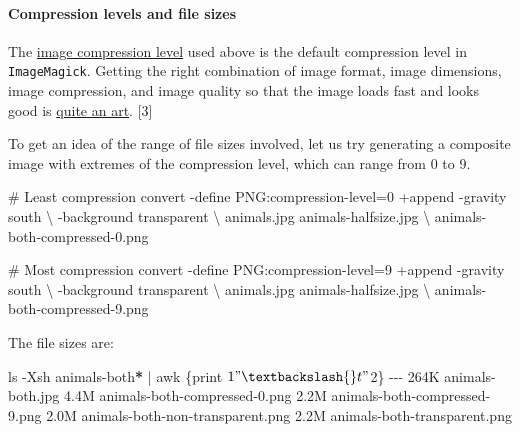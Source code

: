 \documentclass[
  11pt,
  british,
  a4paper,
]{article}
\newenvironment{Shaded}{\begin{snugshade}}{\end{snugshade}}
\newcommand{\AttributeTok}[1]{\textcolor[rgb]{0.80,0.80,0.80}{#1}}
\newcommand{\CommentTok}[1]{\textcolor[rgb]{0.50,0.62,0.50}{#1}}
\newcommand{\DataTypeTok}[1]{\textcolor[rgb]{0.87,0.87,0.75}{#1}}
\newcommand{\ExtensionTok}[1]{\textcolor[rgb]{0.80,0.80,0.80}{#1}}
\newcommand{\FunctionTok}[1]{\textcolor[rgb]{0.94,0.94,0.56}{#1}}
\newcommand{\KeywordTok}[1]{\textcolor[rgb]{0.94,0.87,0.69}{#1}}
\newcommand{\NormalTok}[1]{\textcolor[rgb]{0.80,0.80,0.80}{#1}}
\newcommand{\PreprocessorTok}[1]{\textcolor[rgb]{1.00,0.81,0.69}{\textbf{#1}}}
\newcommand{\StringTok}[1]{\textcolor[rgb]{0.80,0.58,0.58}{#1}}
\begin{document}
\hypertarget{compression-levels-and-file-sizes}{%
\paragraph{Compression levels and file
sizes}\label{compression-levels-and-file-sizes}}

The \href{https://en.wikipedia.org/wiki/Image_compression}{image
compression level} used above is the default compression level in
\texttt{ImageMagick}. Getting the right combination of image format,
image dimensions, image compression, and image quality so that the image
loads fast and looks good is
\href{https://www.smashingmagazine.com/2015/06/efficient-image-resizing-with-imagemagick/}{quite
an art}. {[}3{]}

To get an idea of the range of file sizes involved, let us try
generating a composite image with extremes of the compression level,
which can range from 0 to 9.

\begin{Shaded}
\begin{Highlighting}[]
\CommentTok{\# Least compression}
\ExtensionTok{convert} \AttributeTok{{-}define}\NormalTok{ PNG:compression{-}level=0 +append }\AttributeTok{{-}gravity}\NormalTok{ south }\DataTypeTok{\textbackslash{}}
\NormalTok{{-}background transparent }\DataTypeTok{\textbackslash{}}
\NormalTok{animals.jpg animals{-}halfsize.jpg }\DataTypeTok{\textbackslash{}}
\NormalTok{animals{-}both{-}compressed{-}0.png}

\CommentTok{\# Most compression}
\ExtensionTok{convert} \AttributeTok{{-}define}\NormalTok{ PNG:compression{-}level=9 +append }\AttributeTok{{-}gravity}\NormalTok{ south }\DataTypeTok{\textbackslash{}}
\NormalTok{{-}background transparent }\DataTypeTok{\textbackslash{}}
\NormalTok{animals.jpg animals{-}halfsize.jpg }\DataTypeTok{\textbackslash{}}
\NormalTok{animals{-}both{-}compressed{-}9.png}
\end{Highlighting}
\end{Shaded}

The file sizes are:

\begin{Shaded}
\begin{Highlighting}[]
\FunctionTok{ls} \AttributeTok{{-}Xsh}\NormalTok{ animals{-}both}\PreprocessorTok{*} \KeywordTok{|} \FunctionTok{awk} \StringTok{\textquotesingle{}\{print $1 "\textbackslash{}t" $2\}\textquotesingle{}}
\ExtensionTok{{-}{-}{-}}
\ExtensionTok{264K}\NormalTok{    animals{-}both.jpg}
\ExtensionTok{4.4M}\NormalTok{    animals{-}both{-}compressed{-}0.png}
\ExtensionTok{2.2M}\NormalTok{    animals{-}both{-}compressed{-}9.png}
\ExtensionTok{2.0M}\NormalTok{    animals{-}both{-}non{-}transparent.png}
\ExtensionTok{2.2M}\NormalTok{    animals{-}both{-}transparent.png}
\end{Highlighting}
\end{Shaded}
\end{document}
